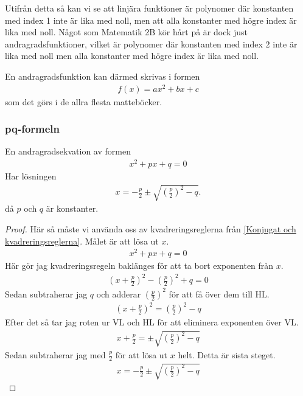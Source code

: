 Utifrån detta så kan vi se att linjära funktioner är polynomer där konstanten med index 1 inte är lika med noll, men att alla konstanter med högre index är lika med noll. Något som Matematik 2B kör hårt på är dock just andragradsfunktioner, vilket är polynomer där konstanten med index 2 inte är lika med noll men alla konstanter med högre index är lika med noll.

En andragradsfunktion kan därmed skrivas i formen
\begin{align}
	f(x) = ax^2 + bx + c
\end{align}
som det görs i de allra flesta matteböcker.

\newpage
\subsubsection{pq-formeln}

\begin{theorem}[pq-formeln]
	En andragradsekvation av formen
	\begin{align}
		x^2+px+q = 0
	\end{align}
	Har lösningen
	\begin{align}
		x = -\frac{p}{2}\pm \sqrt{\left(\frac{p}{2}\right)^2 - q}.
	\end{align}
	då $p$ och $q$ är konstanter.
\end{theorem}

\begin{proof}
Här så måste vi använda oss av kvadreringsreglerna från \ref{Konjugat och kvadreringsreglerna}. Målet är att lösa ut $x$.
\begin{align}
	x^2+px+q = 0
\end{align}
Här gör jag kvadreringsregeln baklänges för att ta bort exponenten från $x$.
\begin{align}
	\left(x+\frac{p}{2}\right)^2-\left(\frac{p}{2}\right)^2+q = 0
\end{align}
Sedan subtraherar jag $q$ och adderar $\left(\frac{p}{2}\right)^2$ för att få över dem till HL.
\begin{align}
	\left(x+\frac{p}{2}\right)^2 = \left(\frac{p}{2}\right)^2 - q
\end{align}
Efter det så tar jag roten ur VL och HL för att eliminera exponenten över VL.
\begin{align}
	x+\frac{p}{2} = \pm \sqrt{\left(\frac{p}{2}\right)^2 - q}
\end{align}
Sedan subtraherar jag med $\frac{p}{2}$ för att lösa ut $x$ helt. Detta är sista steget.
\begin{align}
	x = -\frac{p}{2}\pm \sqrt{\left(\frac{p}{2}\right)^2 - q}
\end{align}
\end{proof}

